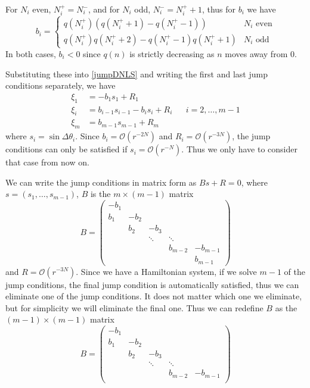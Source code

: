 \documentclass[12pt]{article}
\begin{document}
For $N_i$ even, $N_i^+ = N_i^-$, and for $N_i$ odd, $N_i^- = N_i^+ + 1$, thus for $b_i$ we have
\begin{equation}\label{bieq}
b_i = \begin{cases}
q(N_i^+)\left( q(N_i^+ + 1) - q(N_i^+ - 1) \right) & N_i \text{ even} \\
q(N_i^+)q(N_i^+ + 2) - q(N_i^+ - 1)q(N_i^+ + 1) & N_i \text{ odd}
\end{cases}
\end{equation}
In both cases, $b_i < 0$ since $q(n)$ is strictly decreasing as $n$ moves away from 0.

Substituting these into \eqref{jumpDNLS} and writing the first and last jump conditions separately, we have
\begin{equation}\label{jumpDNLS2}
\begin{aligned}
\xi_1 &= -b_1 s_1 + R_1 \\
\xi_i &= b_{i-1} s_{i-1} - b_i s_i + R_i
&& i = 2, \dots, m-1 \\
\xi_m &= b_{m-1} s_{m-1} + R_m
\end{aligned}
\end{equation}
where $s_i = \sin{\Delta\theta_i}$. Since $b_i = \mathcal{O}(r^{-2N})$ and $R_i = \mathcal{O}(r^{-3N})$, the jump conditions can only be satisfied if $s_i = \mathcal{O}(r^{-N})$. Thus we only have to consider that case from now on. 

We can write the jump conditions in matrix form as $B s + R = 0$, where $s = (s_1, \dots, s_{m-1})$, $B$ is the $m \times (m-1)$ matrix
\[
B = \begin{pmatrix}
-b_1 \\
b_1 & -b_2 \\
& b_2 & -b_3 \\
&& \ddots & \ddots \\
&&& b_{m-2} & -b_{m-1} \\
&&&& b_{m-1}
\end{pmatrix}
\]
and $R = \mathcal{O}(r^{-3N})$. Since we have a Hamiltonian system, if we solve $m-1$ of the jump conditions, the final jump condition is automatically satisfied, thus we can eliminate one of the jump conditions. It does not matter which one we eliminate, but for simplicity we will eliminate the final one. Thus we can redefine $B$ as the $(m-1)\times(m-1)$ matrix
\[
B = \begin{pmatrix}
-b_1 \\
b_1 & -b_2 \\
& b_2 & -b_3 \\
&& \ddots & \ddots \\
&&& b_{m-2} & -b_{m-1} \\
\end{pmatrix}
\]
\end{document}
